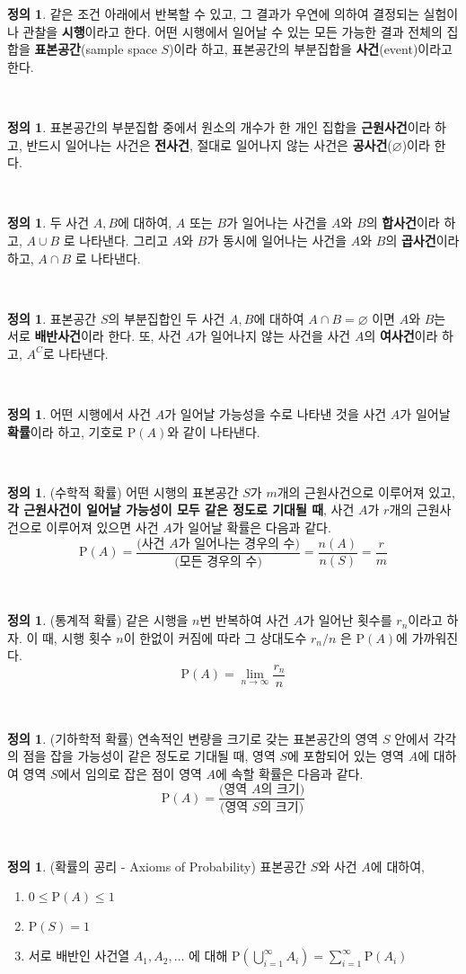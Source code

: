 \documentclass[12pt]{article}
\theoremstyle{definition}
\theoremstyle{definition}
\newtheorem{definition}[theorem]{\sffamily 정의}
\newcommand{\defn}[1]{\begin{definition}#1\end{definition}~}
\newcommand{\ds}{\displaystyle}
\newcommand{\pr}{\text{P}}
\begin{document}
\defn{같은 조건 아래에서 반복할 수 있고, 그 결과가 우연에 의하여 결정되는 실험이나 관찰을 \textbf{시행}이라고 한다. 어떤 시행에서 일어날 수 있는 모든 가능한 결과 전체의 집합을 \textbf{표본공간}(sample space $S$)이라 하고, 표본공간의 부분집합을 \textbf{사건}(event)이라고 한다.}

\defn{표본공간의 부분집합 중에서 원소의 개수가 한 개인 집합을 \textbf{근원사건}이라 하고, 반드시 일어나는 사건은 \textbf{전사건}, 절대로 일어나지 않는 사건은 \textbf{공사건}($\varnothing$)이라 한다.}


\defn{두 사건 $A, B$에 대하여, $A$ 또는 $B$가 일어나는 사건을 $A$와 $B$의 \textbf{합사건}이라 하고, $A\cup B$ 로 나타낸다. 그리고 $A$와 $B$가 동시에 일어나는 사건을 $A$와 $B$의 \textbf{곱사건}이라 하고, $A\cap B$ 로 나타낸다.}

\defn{표본공간 $S$의 부분집합인 두 사건 $A, B$에 대하여 $A\cap B = \varnothing$ 이면 $A$와 $B$는 서로 \textbf{배반사건}이라 한다. 또, 사건 $A$가 일어나지 않는 사건을 사건 $A$의 \textbf{여사건}이라 하고, $A^C$로 나타낸다.}

\defn{어떤 시행에서 사건 $A$가 일어날 가능성을 수로 나타낸 것을 사건 $A$가 일어날 \textbf{확률}이라 하고, 기호로 $\pr(A)$와 같이 나타낸다.}

\defn{(수학적 확률) 어떤 시행의 표본공간 $S$가 $m$개의 근원사건으로 이루어져 있고, \textbf{각 근원사건이 일어날 가능성이 모두 같은 정도로 기대될 때}, 사건 $A$가 $r$개의 근원사건으로 이루어져 있으면 사건 $A$가 일어날 확률은 다음과 같다.$$\pr(A) = \frac{\text{(사건 }A\text{가 일어나는 경우의 수)}}{\text{(모든 경우의 수)}} =\frac{n(A)}{n(S)} = \frac{r}{m}$$}

\defn{(통계적 확률) 같은 시행을 $n$번 반복하여 사건 $A$가 일어난 횟수를 $r_n$이라고 하자. 이 때, 시행 횟수 $n$이 한없이 커짐에 따라 그 상대도수 $r_n/n$ 은 $\pr(A)$에 가까워진다. $$\pr(A)=\lim_{n\rightarrow \infty} \frac{r_n}{n}$$} 

\defn{(기하학적 확률) 연속적인 변량을 크기로 갖는 표본공간의 영역 $S$ 안에서 각각의 점을 잡을 가능성이 같은 정도로 기대될 때, 영역 $S$에 포함되어 있는 영역 $A$에 대하여 영역 $S$에서 임의로 잡은 점이 영역 $A$에 속할 확률은 다음과 같다. $$\pr(A) = \frac{\text{(영역 }A\text{의 크기)}}{\text{(영역 }S\text{의 크기)}}$$ }

\defn{(확률의 공리 - Axioms of Probability) 표본공간 $S$와 사건 $A$에 대하여,
\begin{enumerate}
	\item[(1)] $0\leq \pr(A)\leq 1$
	\item[(2)] $\pr(S) = 1$
	\item[(3)] 서로 배반인 사건열 $A_1, A_2, \dots$ 에 대해 $\ds \pr\left(\bigcup_{i=1}^\infty A_i\right) = \sum_{i=1}^\infty \pr(A_i)$
\end{enumerate}
}
\end{document}
